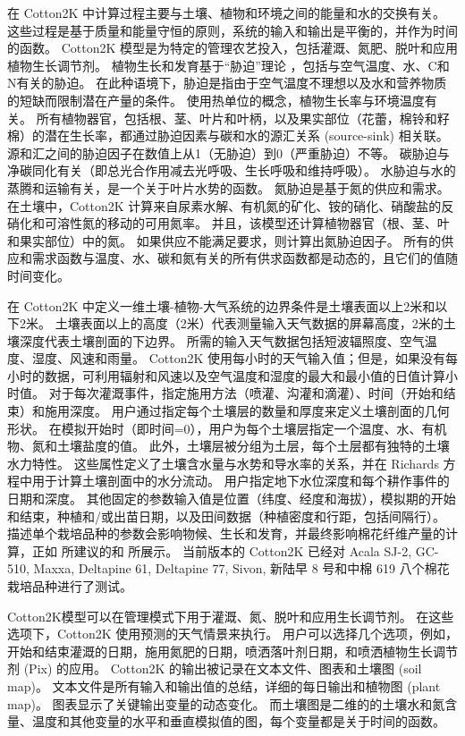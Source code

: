 在 Cotton2K 中计算过程主要与土壤、植物和环境之间的能量和水的交换有关。
这些过程是基于质量和能量守恒的原则，系统的输入和输出是平衡的，并作为时间的函数。
Cotton2K 模型是为特定的管理农艺投入，包括灌溉、氮肥、脱叶和应用植物生长调节剂。
植物生长和发育基于“胁迫”理论 \cite{grime1977,craine2005,grime2007}，包括与空气温度、水、C和N有关的胁迫。
在此种语境下，胁迫是指由于空气温度不理想以及水和营养物质的短缺而限制潜在产量的条件\cite{grime1977}。
使用热单位的概念，植物生长率与环境温度有关\cite{wang1960,peng1989}。
所有植物器官，包括根、茎、叶片和叶柄，以及果实部位（花蕾，棉铃和籽棉）的潜在生长率，都通过胁迫因素与碳和水的源汇关系 (source-sink) 相关联。
源和汇之间的胁迫因子在数值上从1（无胁迫）到0（严重胁迫）不等。
碳胁迫与净碳同化有关（即总光合作用减去光呼吸、生长呼吸和维持呼吸）。
水胁迫与水的蒸腾和运输有关，是一个关于叶片水势的函数。
氮胁迫是基于氮的供应和需求。
在土壤中，Cotton2K 计算来自尿素水解、有机氮的矿化、铵的硝化、硝酸盐的反硝化和可溶性氮的移动的可用氮率。
并且，该模型还计算植物器官（根、茎、叶和果实部位）中的氮。
如果供应不能满足要求，则计算出氮胁迫因子。
所有的供应和需求函数与温度、水、碳和氮有关的所有供求函数都是动态的，且它们的值随时间变化。

在 Cotton2K 中定义一维土壤-植物-大气系统的边界条件是土壤表面以上2米和以下2米。
土壤表面以上的高度（2米）代表测量输入天气数据的屏幕高度，2米的土壤深度代表土壤剖面的下边界。
所需的输入天气数据包括短波辐照度、空气温度、湿度、风速和雨量。
Cotton2K 使用每小时的天气输入值；但是，如果没有每小时的数据，可利用辐射和风速以及空气温度和湿度的最大和最小值的日值计算小时值\cite{ephrath1996}。
对于每次灌溉事件，指定施用方法（喷灌、沟灌和滴灌）、时间（开始和结束）和施用深度。
用户通过指定每个土壤层的数量和厚度来定义土壤剖面的几何形状。
在模拟开始时（即时间=0），用户为每个土壤层指定一个温度、水、有机物、氮和土壤盐度的值。
此外，土壤层被分组为土层，每个土层都有独特的土壤水力特性。
这些属性定义了土壤含水量与水势和导水率的关系，并在 Richards 方程中用于计算土壤剖面中的水分流动。
用户指定地下水位深度和每个耕作事件的日期和深度。
其他固定的参数输入值是位置（纬度、经度和海拔），模拟期的开始和结束，种植和/或出苗日期，以及田间数据（种植密度和行距，包括间隔行）。
描述单个栽培品种的参数会影响物候、生长和发育，并最终影响棉花纤维产量的计算，正如  所建议的和 所展示。
当前版本的 Cotton2K 已经对 Acala SJ-2, GC-510, Maxxa, Deltapine 61, Deltapine 77, Sivon, 新陆早 8 号和中棉 619\cite{zhu2021} 八个棉花栽培品种进行了测试。

Cotton2K模型可以在管理模式下用于灌溉、氮、脱叶和应用生长调节剂。
在这些选项下，Cotton2K 使用预测的天气情景来执行。
用户可以选择几个选项，例如，开始和结束灌溉的日期，施用氮肥的日期，喷洒落叶剂日期，和喷洒植物生长调节剂 (Pix) 的应用。
Cotton2K 的输出被记录在文本文件、图表和土壤图 (soil map)。
文本文件是所有输入和输出值的总结，详细的每日输出和植物图 (plant map)。
图表显示了关键输出变量的动态变化。
而土壤图是二维的的土壤水和氮含量、温度和其他变量的水平和垂直模拟值的图，每个变量都是关于时间的函数。

